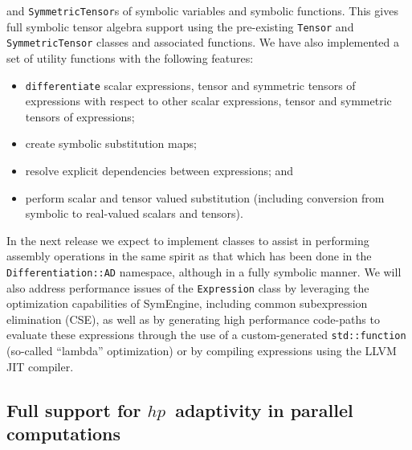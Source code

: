 \documentclass{ansarticle-preprint}
\begin{document}
and \texttt{SymmetricTensor}s of symbolic variables and symbolic functions. This
gives full symbolic tensor algebra support using the pre-existing \texttt{Tensor}
and \texttt{SymmetricTensor} classes and associated functions. We have
also implemented a set of utility functions with the following features:
\begin{itemize}
\item \texttt{differentiate} scalar expressions, tensor and symmetric tensors of expressions
with respect to other scalar expressions, tensor and symmetric tensors of expressions;
\item create symbolic substitution maps;
\item resolve explicit dependencies between expressions; and
\item perform scalar and tensor valued substitution (including conversion from symbolic to
real-valued scalars and tensors).
\end{itemize}

In the next release we expect to implement classes to assist in performing assembly operations
in the same spirit as that which has been done in the \texttt{Differentiation::AD} namespace,
although in a fully symbolic manner.
We will also address performance issues of the \texttt{Expression} class by leveraging
the optimization capabilities of SymEngine, including common subexpression elimination (CSE),
as well as by generating high performance code-paths to evaluate these expressions through the
use of a custom-generated \texttt{std::function} (so-called ``lambda'' optimization) or by
compiling expressions using the LLVM JIT compiler.

\subsection{Full support for $hp$~adaptivity in parallel computations}
\label{subsec:hp}
\end{document}
